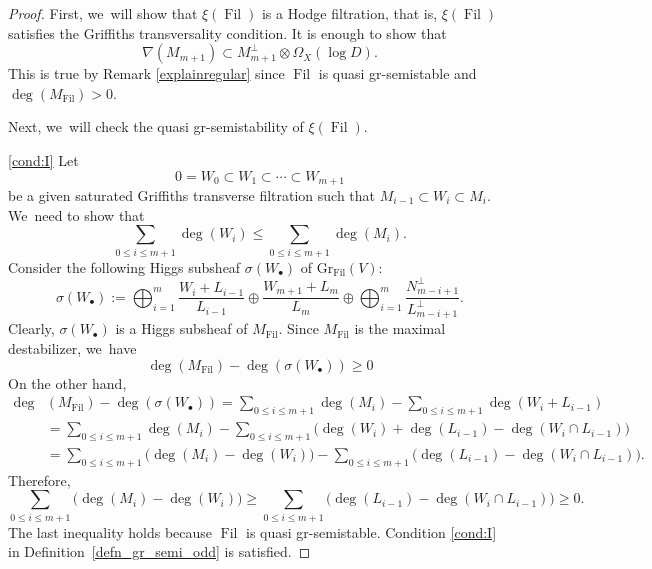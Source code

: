 \documentclass[JEP,XML,SOM,Unicode,published]{cedram}
\newcommand{\sbullet}{{\scriptscriptstyle\bullet}}
\newcommand{\grsemistable}{gr\nobreakdash-semi\-stable\xspace}
\DeclareMathOperator{\Filt}{Fil}
\newcommand{\Gr}{\mathrm{Gr}}
\theoremstyle{plain}
\theoremstyle{definition}
\begin{document}
\begin{proof}
First, we~will show that $\xi(\Filt)$ is a Hodge filtration, that is, $\xi(\Filt)$ satisfies the Griffiths transversality condition. It is enough to show that
\[
\nabla(M_{m+1})\subset M_{m+1}^\perp\otimes\Omega_X(\log D).
\]
This is true by Remark \ref{explainregular} since $\Filt$ is quasi \grsemistable and $\deg(M_{\Filt})>0$.

Next, we~will check the quasi gr-semistability of $\xi(\Filt)$.

\eqref{cond:I}
Let
\[
0=W_0\subset W_1 \subset \cdots\subset W_{m+1}
\]
be a given saturated Griffiths transverse filtration such that $M_{i-1}\subset W_i\subset M_i$. We~need to show that
\[
\sum_{0\leq i\leq m+1}\deg(W_i)\leqslant\sum_{0\leq i\leq m+1}\deg(M_i).
\]
Consider the following Higgs subsheaf $\sigma(W_\sbullet)$ of $\Gr_{\Filt}(V)$:
\[
\sigma(W_\sbullet):=\mathop{\bigoplus}_{i=1}^{m} \frac{W_i+L_{i-1}}{L_{i-1}}\oplus\frac{W_{m+1}+L_m}{L_m} \oplus \mathop{\bigoplus}_{i=1}^{m} \frac{N_{m-i+1}^\perp}{L_{m-i+1}^\perp}.
\]
Clearly, $\sigma(W_\sbullet)$ is a Higgs subsheaf of $M_{\Filt}$. Since $M_{\Filt}$ is the maximal destabilizer, we~have
\begin{equation}
\deg(M_{\Filt})-\deg(\sigma(W_\sbullet))\geq 0
\end{equation}
On the other hand,
\begin{align*}
\deg&(M_{\Filt})-\deg(\sigma(W_\sbullet))=\sum_{0\leq i\leq m+1}\deg(M_i)-\sum_{0\leq i\leq m+1}\deg(W_i+L_{i-1})\\
&=\sum_{0\leq i\leq m+1}\deg(M_i)-\sum_{0\leq i\leq m+1}\big(\deg(W_i)+\deg(L_{i-1})-\deg(W_i\cap L_{i-1})\big)\\
&=\sum_{0\leq i\leq m+1}\big(\deg(M_i)-\deg(W_i)\big)-\sum_{0\leq i\leq m+1}\big(\deg(L_{i-1})-\deg(W_i\cap L_{i-1})\big).
\end{align*}
Therefore,
\begin{equation}\label{increasing}
\sum_{0\leq i\leq m+1}\big(\deg(M_i)-\deg(W_i)\big)\geq \sum_{0\leq i\leq m+1}\big(\deg(L_{i-1})-\deg(W_i\cap L_{i-1})\big)\geq 0.
\end{equation}
The last inequality holds because $\Filt$ is quasi \grsemistable. Condition \eqref{cond:I} in Definition~\ref{defn_gr_semi_odd} is satisfied.


\end{proof}
\end{document}
